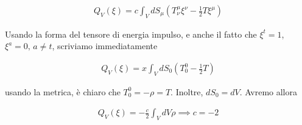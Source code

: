 \documentclass{report}
\begin{document}
\begin{align}
    Q_V(\xi) = c\int_V dS_\mu (T^{\mu}_\nu \xi^\nu - \frac{1}{2}T \xi^\mu)
\end{align}

Usando la forma del tensore di energia impulso, e anche il fatto che \(\xi^t = 1\), \(\xi^a = 0, \, a \neq t\), scriviamo immediatamente 

\begin{align}
    Q_V(\xi) = x \int_V dS_0 (T^0_0 - \frac{1}{2}T)
\end{align}

usando la metrica, è chiaro che \(T^0_0 = -\rho = T\). Inoltre, \(dS_0= dV\). Avremo allora 

\begin{align}
    Q_V(\xi) = -\frac{c}{2}\int_V dV \rho \implies c = -2
\end{align}
\end{document}
